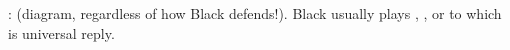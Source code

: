 :  (diagram, regardless of how Black defends!).
Black usually plays , ,  or  to which  is universal reply.
